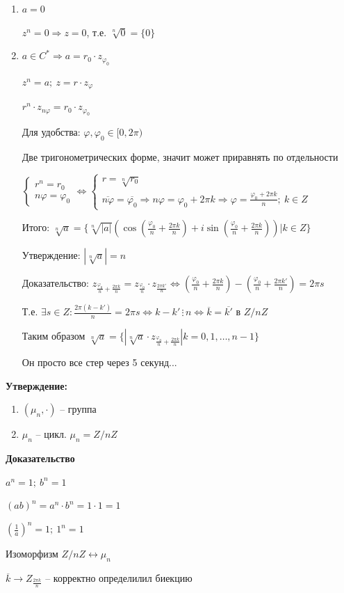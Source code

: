 \documentclass[14pt, letter paper]{article}
\begin{document}
\begin{enumerate}
    \item $a = 0$
    
    $z^n = 0 \Rightarrow z = 0$, т.е. $\sqrt[n]{0} = \{0\}$

    \item $a \in C^* \Rightarrow a = r_0 \cdot z_{\varphi_0}$
    
    $z^n = a;\ z = r \cdot z_\varphi$

    $r^n \cdot z_{n\varphi} = r_0 \cdot z_{\varphi_0}$

    Для удобства: $\varphi, \varphi_0 \in [0, 2\pi)$

    Две тригонометрических форме, значит может приравнять по отдельности

    $\begin{cases}
        r^n = r_0 \\
        n\varphi = \varphi_0
    \end{cases} \Leftrightarrow \begin{cases}
        r = \sqrt[n]{r_0} \\
        \overline{n\varphi} = \overline{\varphi_0} \Rightarrow n\varphi = \varphi_0 + 2\pi k \Rightarrow \varphi = \frac{\varphi_0 + 2\pi k}{n};\ k \in Z
    \end{cases}$

    Итого: $\sqrt[n]{a} = \{\sqrt[n]{|a|}(\cos(\frac{\varphi_0}{n} + \frac{2\pi k}{n}) + i\sin(\frac{\varphi_0}{n} + \frac{2\pi k}{n})) | k \in Z\}$

    Утверждение: $|\sqrt[n]{a}| = n$

    Доказательство: $z_{\frac{\varphi_0}{n} + \frac{2\pi k}{n}} = z_{\frac{\varphi_0}{n}} \cdot z_{\frac{2\pi k'}{n}} \Leftrightarrow (\frac{\varphi_0}{n} + \frac{2\pi k}{n}) - (\frac{\varphi_0}{n} + \frac{2\pi k'}{n}) = 2\pi s$

    Т.е. $\exists s \in Z : \frac{2 \pi (k - k')}{n} = 2\pi s \Leftrightarrow k - k' \, \vdots \, n \Leftrightarrow \overline{k} = \overline{k'}$ в $Z/nZ$

    Таким образом $\sqrt[n]{a} = \{ |\sqrt[n]{a} \cdot z_{\frac{\varphi_0}{n} + \frac{2\pi k}{n}} | k = 0, 1, \ldots, n - 1\}$ 

    Он просто все стер через 5 секунд...
\end{enumerate}

\textbf{Утверждение:} 

\begin{enumerate}
    \item $(\mu_n, \cdot)$ -- группа
    \item $\mu_n$ -- цикл. $\mu_n = Z/nZ$
\end{enumerate}

\begin{center}
    \textbf{Доказательство}
\end{center}

$a^n = 1;\ b^n = 1$

$(ab)^n = a^n \cdot b^n = 1 \cdot 1 = 1$

$(\frac{1}{a})^n = 1;\ 1^n = 1$

Изоморфизм $Z/nZ \leftrightarrow \mu_n$

$\overline{k} \rightarrow Z_{\frac{2\pi k}{n}}$ -- корректно определилил биекцию
\end{document}

